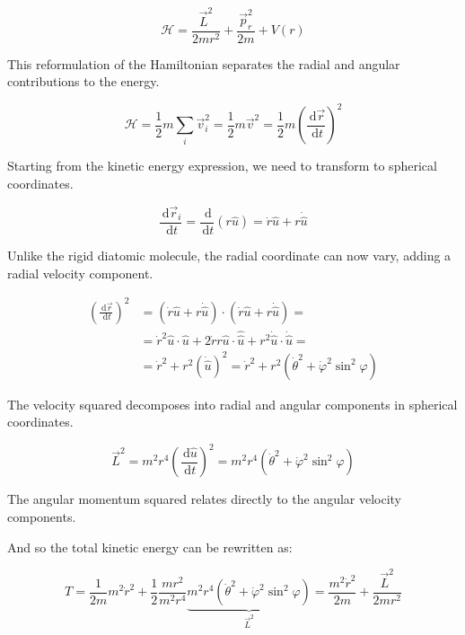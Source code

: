 \documentclass[italian]{HKNdocument}
\begin{document}
\begin{equation}
\mathcal{H}=\frac{\vec{L}^{2}}{2 m r^{2}}+\frac{\vec{p}_{r}^{2}}{2 m}+V(r) \label{eq:9.3}
\end{equation}

This reformulation of the Hamiltonian separates the radial and angular contributions to the energy.

\begin{equation}
\mathcal{H}=\frac{1}{2} m \sum_{i} \vec{v}_{i}^{2}=\frac{1}{2} m \vec{v}^{2}=\frac{1}{2} m\left(\frac{\, \mathrm{d} \vec{r}}{\, \mathrm{d} t}\right)^{2} \label{eq:9.4}
\end{equation}

Starting from the kinetic energy expression, we need to transform to spherical coordinates.

\begin{equation}
\frac{\, \mathrm{d} \vec{r}_{i}}{\, \mathrm{d} t}=\frac{\, \mathrm{d}}{\, \mathrm{d} t}(r \hat{u})=\dot{r} \hat{u}+r \dot{\hat{u}} \label{eq:9.5}
\end{equation}

Unlike the rigid diatomic molecule, the radial coordinate can now vary, adding a radial velocity component.

\begin{align}
\left(\frac{\, \mathrm{d} \vec{r}}{\, \mathrm{d} t}\right)^{2} & =(\dot{r} \hat{u}+r \dot{\hat{u}}) \cdot(\dot{r} \hat{u}+r \dot{\hat{u}})= \\
& =\dot{r}^{2} \hat{u} \cdot \hat{u}+2 \dot{r} r \hat{u} \cdot \hat{\hat{u}}+r^{2} \dot{\hat{u}} \cdot \dot{\hat{u}}=  \label{eq:9.6}\\
& =\dot{r}^{2}+r^{2}(\dot{\hat{u}})^{2}=\dot{r}^{2}+r^{2}\left(\dot{\theta}^{2}+\dot{\varphi}^{2} \sin ^{2} \varphi\right)
\end{align}

The velocity squared decomposes into radial and angular components in spherical coordinates.

\begin{equation}
\vec{L}^{2}=m^{2} r^{4}\left(\frac{\, \mathrm{d} \hat{u}}{\, \mathrm{d} t}\right)^{2}=m^{2} r^{4}\left(\dot{\theta}^{2}+\dot{\varphi}^{2} \sin ^{2} \varphi\right) \label{eq:9.7}
\end{equation}

The angular momentum squared relates directly to the angular velocity components.

And so the total kinetic energy can be rewritten as:

\begin{equation}
T=\frac{1}{2 m} m^{2} \dot{r}^{2}+\frac{1}{2} \frac{m r^{2}}{m^{2} r^{4}} \underbrace{m^{2} r^{4}\left(\dot{\theta}^{2}+\dot{\varphi}^{2} \sin ^{2} \varphi\right)}_{\vec{L}^{2}}=\frac{m^{2} \dot{r}^{2}}{2 m}+\frac{\vec{L}^{2}}{2 m r^{2}} \label{eq:9.8}
\end{equation}
\end{document}
